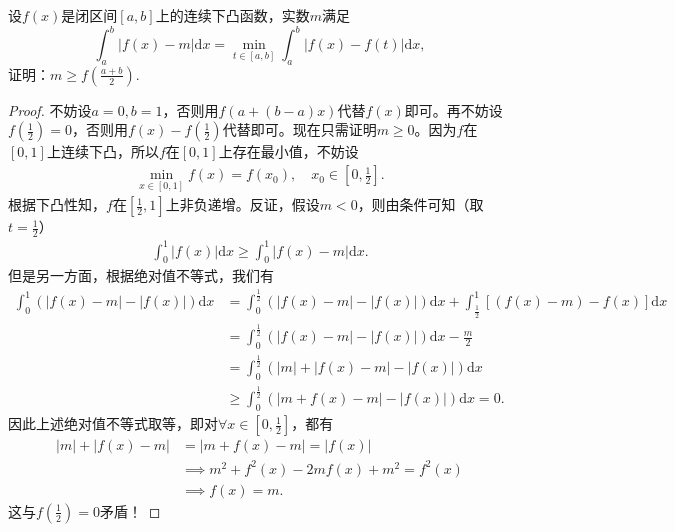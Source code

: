 \documentclass[../../main.tex]{subfiles}%
\begin{document}
\begin{example}
设\( f(x) \)是闭区间\( [a,b] \)上的连续下凸函数，实数\( m \)满足
\[
\int_{a}^{b}|f(x) - m|\mathrm{d}x = \min_{t \in [a,b]}\int_{a}^{b}|f(x) - f(t)|\mathrm{d}x,
\]
证明：\( m \geqslant f\left( \frac{a + b}{2} \right) \).
\end{example}
\begin{proof}

不妨设\( a=0, b=1 \)，否则用\( f(a+(b-a)x) \)代替\( f(x) \)即可。再不妨设\( f\left( \frac{1}{2} \right) =0 \)，否则用\( f(x)-f\left( \frac{1}{2} \right) \)代替即可。现在只需证明\( m \geqslant 0 \)。因为\( f \)在\( [0,1] \)上连续下凸，所以\( f \)在\( [0,1] \)上存在最小值，不妨设
\begin{align*}
\min_{x \in [0,1]} f(x) = f(x_0), \quad x_0 \in \left[ 0, \frac{1}{2} \right].
\end{align*}
根据下凸性知，\( f \)在\( \left[ \frac{1}{2},1 \right] \)上非负递增。反证，假设\( m < 0 \)，则由条件可知（取\( t=\frac{1}{2} \)）
\begin{align*}
\int_0^1 |f(x)| \mathrm{d}x \geqslant \int_0^1 |f(x)-m| \mathrm{d}x.
\end{align*}
但是另一方面，根据绝对值不等式，我们有
\begin{align*}
\int_0^1 \left( |f(x)-m| - |f(x)| \right) \mathrm{d}x &= \int_0^{\frac{1}{2}} \left( |f(x)-m| - |f(x)| \right) \mathrm{d}x + \int_{\frac{1}{2}}^1 \left[ (f(x)-m) - f(x) \right] \mathrm{d}x \\
&= \int_0^{\frac{1}{2}} \left( |f(x)-m| - |f(x)| \right) \mathrm{d}x - \frac{m}{2} \\
&= \int_0^{\frac{1}{2}} \left( |m| + |f(x)-m| - |f(x)| \right) \mathrm{d}x \\
&\geqslant \int_0^{\frac{1}{2}} \left( |m + f(x) - m| - |f(x)| \right) \mathrm{d}x = 0.
\end{align*}
因此上述绝对值不等式取等，即对\( \forall x \in \left[ 0, \frac{1}{2} \right] \)，都有
\begin{align*}
|m| + |f(x)-m| &= |m + f(x) - m| = |f(x)| \\
&\implies m^2 + f^2(x) - 2mf(x) + m^2 = f^2(x) \\
&\implies f(x) = m.
\end{align*}
这与\( f\left( \frac{1}{2} \right) = 0 \)矛盾！

\end{proof}
\end{document}
